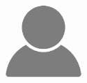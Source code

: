 \documentclass[a4paper,12pt,oneside]{article}
\begin{document}
\begin{figure}
       \begin{center}
            \includegraphics[width=0.30\textwidth]{portret}
        \end{center}
\end{figure}
\end{document}
